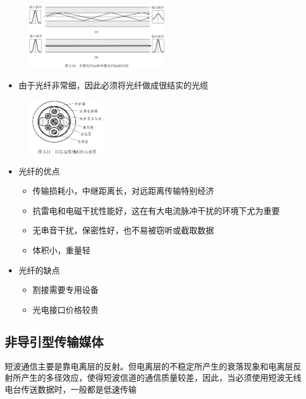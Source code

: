 \documentclass[cs4size,a4paper,10pt]{ctexart}
\begin{document}
	\begin{figure}[H]
		\centering
		\includegraphics[width=0.55\textwidth]{img/2.10}
	\end{figure}

	\begin{itemize}
		\item 由于光纤非常细，因此必须将光纤做成很结实的光缆
	\end{itemize}

	\begin{figure}[H]
		\centering
		\includegraphics[width=0.3\textwidth]{img/2.11}
	\end{figure}

	\begin{itemize}
		\item 光纤的优点
		\begin{itemize}
			\item 传输损耗小，中继距离长，对远距离传输特别经济
			\item 抗雷电和电磁干扰性能好，这在有大电流脉冲干扰的环境下尤为重要
			\item 无串音干扰，保密性好，也不易被窃听或截取数据
			\item 体积小，重量轻
		\end{itemize}
		\item 光纤的缺点
		\begin{itemize}
			\item 割接需要专用设备
			\item 光电接口价格较贵
		\end{itemize}
	\end{itemize}

	\subsection{非导引型传输媒体}
	短波通信主要是靠电离层的反射。但电离层的不稳定所产生的衰落现象和电离层反射所产生的多径效应，使得短波信道的通信质量较差，因此，当必须使用短波无线电台传送数据时，一般都是低速传输
\end{document}
